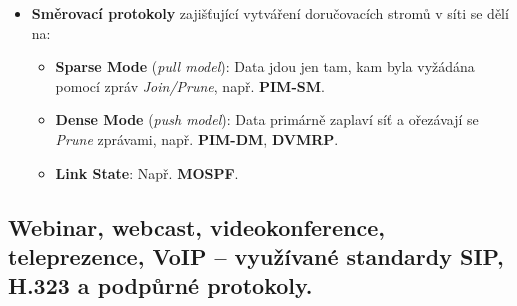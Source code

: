 \begin{itemize}
\begin{itemize}
                    \item \textbf{Směrovací protokoly} zajišťující vytváření doručovacích stromů v síti se dělí na:
                    \begin{itemize}
                        \item \textbf{Sparse Mode} (\textit{pull model}): Data jdou jen tam, kam byla vyžádána pomocí zpráv \textit{Join/Prune}, např. \textbf{PIM-SM}.
                        \item \textbf{Dense Mode} (\textit{push model}): Data primárně zaplaví síť a ořezávají se \textit{Prune} zprávami, např. \textbf{PIM-DM}, \textbf{DVMRP}.
                        \item \textbf{Link State}: Např. \textbf{MOSPF}.
                    \end{itemize}
                \end{itemize}
        \end{itemize}
\subsection{Webinar, webcast, videokonference, teleprezence, VoIP – využívané standardy SIP, H.323 a podpůrné protokoly.}
